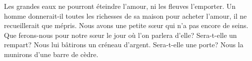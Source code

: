 Les grandes eaux ne pourront éteindre l’amour,
	ni les fleuves l’emporter.
Un homme donnerait-il toutes les richesses de sa maison pour acheter l’amour,
	il ne recueillerait que mépris.
Nous avons une petite sœur qui n’a pas encore de seins.
	Que ferons-nous pour notre sœur le jour où l’on parlera d’elle?
Sera-t-elle un rempart? Nous lui bâtirons un créneau d’argent.
Sera-t-elle une porte? Nous la munirons d’une barre de cèdre.
